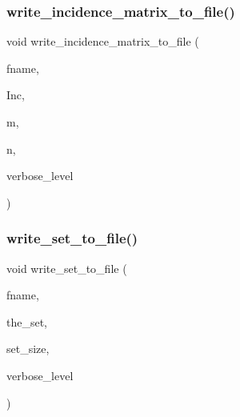 \subsubsection{\texorpdfstring{write\+\_\+incidence\+\_\+matrix\+\_\+to\+\_\+file()}{write\_incidence\_matrix\_to\_file()}}
{\footnotesize\ttfamily void write\+\_\+incidence\+\_\+matrix\+\_\+to\+\_\+file (\begin{DoxyParamCaption}\item[{\mbox{\hyperlink{galois_8h_ab6cc7b4aeb6ea31aba2b3fbfc83ff5e6}{B\+Y\+TE}} $\ast$}]{fname,  }\item[{\mbox{\hyperlink{galois_8h_a09fddde158a3a20bd2dcadb609de11dc}{I\+NT}} $\ast$}]{Inc,  }\item[{\mbox{\hyperlink{galois_8h_a09fddde158a3a20bd2dcadb609de11dc}{I\+NT}}}]{m,  }\item[{\mbox{\hyperlink{galois_8h_a09fddde158a3a20bd2dcadb609de11dc}{I\+NT}}}]{n,  }\item[{\mbox{\hyperlink{galois_8h_a09fddde158a3a20bd2dcadb609de11dc}{I\+NT}}}]{verbose\+\_\+level }\end{DoxyParamCaption})}

\mbox{\label{util_8_c_a3d2767f53fed9a2dacf580e0b2d4b961}} 
\subsubsection{\texorpdfstring{write\+\_\+set\+\_\+to\+\_\+file()}{write\_set\_to\_file()}}
{\footnotesize\ttfamily void write\+\_\+set\+\_\+to\+\_\+file (\begin{DoxyParamCaption}\item[{const \mbox{\hyperlink{galois_8h_ab6cc7b4aeb6ea31aba2b3fbfc83ff5e6}{B\+Y\+TE}} $\ast$}]{fname,  }\item[{\mbox{\hyperlink{galois_8h_a09fddde158a3a20bd2dcadb609de11dc}{I\+NT}} $\ast$}]{the\+\_\+set,  }\item[{\mbox{\hyperlink{galois_8h_a09fddde158a3a20bd2dcadb609de11dc}{I\+NT}}}]{set\+\_\+size,  }\item[{\mbox{\hyperlink{galois_8h_a09fddde158a3a20bd2dcadb609de11dc}{I\+NT}}}]{verbose\+\_\+level }\end{DoxyParamCaption})}

\mbox{\label{util_8_c_ad354043faa0d816b08db1bbd68c250cd}} 
